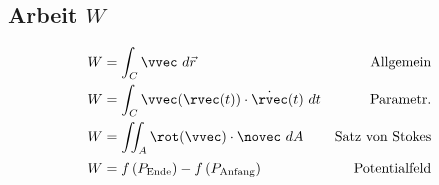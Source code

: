 \subsection{Arbeit \hfill $W$}
    \vspace{-1em}
    \begin{align*}
        W &= \int_C \vvec \ d \vec{r} &\textrm{Allgemein}\\
        W &= \int_C \vvec(\rvec(t)) \cdot \dot{\rvec}(t) \ dt &\textrm{Parametr.}\\
        W &= \iint_{A} \rot(\vvec) \cdot \novec \ dA & \textrm{Satz von Stokes}\\[0.125em]
        W &= f\left(P_{\textrm{Ende}}\right) - f\left(P_{\textrm{Anfang}}\right) &\textrm{Potentialfeld}
    \end{align*}
    \vfill \null \columnbreak
